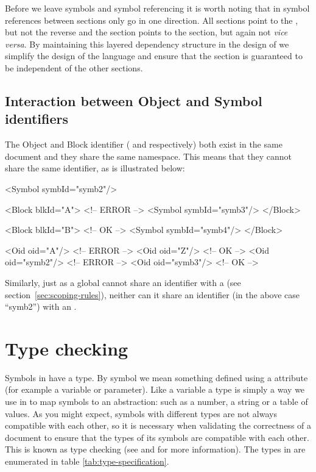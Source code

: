 
Before we leave symbols and symbol referencing it is worth noting
that in \pharmml symbol references between sections only go in one
direction. All sections point to the , but not
the reverse and the  section points to the
 section, but again not \emph{vice
  versa}\xspace. By maintaining this layered dependency structure in
the design of \pharmml we simplify the design of the language and ensure
that the  section is guaranteed to be
independent of the other \pharmml sections.

\subsection{Interaction between Object and Symbol identifiers}

The Object and Block identifier ( and 
respectively) both exist in the same \pharmml document and they share
the same namespace. This means that they cannot share the same
identifier, as is illustrated below:
%
\begin{xmlcode}
<Symbol symbId="symb2"/>

<Block blkId="A"> <!-- ERROR -->
	<Symbol symbId="symb3"/>
</Block>

<Block blkId="B"> <!-- OK -->
	<Symbol symbId="symb4"/>
</Block>

<Oid oid="A"/> <!-- ERROR -->
<Oid oid="Z"/> <!-- OK -->
<Oid oid="symb2"/> <!-- ERROR -->
<Oid oid="symb3"/> <!-- OK -->
\end{xmlcode}
%
Similarly, just as a global  cannot share an identifier with a
 (see section~\ref{sec:scoping-rules}), neither can it
share an identifier (in the above case ``symb2'') with an .


\section{Type checking}
\label{sec:type-checking}

Symbols in \pharmml have a type. By symbol we mean something defined
using a  attribute (for example a variable or
parameter). Like a variable a type is simply a way we use in \pharmml to
map symbols to an abstraction: such as a number, a string or a table
of values. As you might expect, symbols with different types are not
always compatible with each other, so it is necessary when validating
the correctness of a \pharmml document to ensure that the types of its
symbols are compatible with each other. This is known as type checking
(see \cite[Chapter6]{Aho:1986fk} and \cite[Chapter 8]{Parr:2010uq} for
more information). The types in \pharmml are enumerated in table
\ref{tab:type-specification}.


